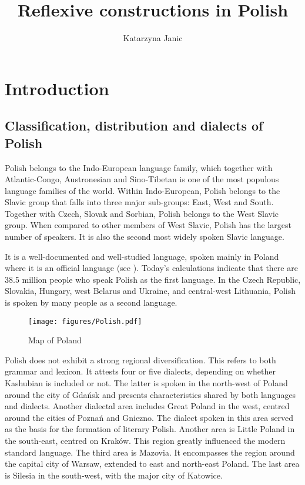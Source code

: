 \documentclass[output=paper]{langscibook}
\author{Katarzyna Janic\affiliation{Leipzig University}}
\title{Reflexive constructions in Polish}
\begin{document}
\maketitle

\section{Introduction} \label{sec:Janic:1}

\subsection{Classification, distribution and dialects of Polish} \label{sec:Janic:1.1}

Polish belongs to the Indo-European language family, which together with Atlantic-Congo, Austronesian and Sino-Tibetan is one of the most populous language families of the world. Within Indo-European, Polish belongs to the Slavic group that falls into three major sub-groups: East, West and South. Together with Czech, Slovak and Sorbian, Polish belongs to the West Slavic group. When compared to other members of West Slavic, Polish has the largest number of speakers. It is also the second most widely spoken Slavic language.

It is a well-documented and well-studied language, spoken mainly in Poland where it is an official language (see ). Today’s calculations indicate that there are 38.5 million people who speak Polish as the first language. In the Czech Republic, Slovakia, Hungary, west Belarus and Ukraine, and central-west Lithuania, Polish is spoken by many people as a second language. 

\begin{figure}
\texttt{[image: figures/Polish.pdf]}
  \caption{\label{fig:Janic:1}Map of Poland}
\end{figure}


Polish does not exhibit a strong regional diversification. This refers to both grammar and lexicon. It attests four or five dialects, depending on whether Kashubian is included or not. The latter is spoken in the north-west of Poland around the city of Gdańsk and presents characteristics shared by both languages and dialects. Another dialectal area includes Great Poland in the west, centred around the cities of Poznań and Gniezno. The dialect spoken in this area served as the basis for the formation of literary Polish. Another area is Little Poland in the south-east, centred on Kraków. This region greatly influenced the modern standard language. The third area is Mazovia. It encompasses the region around the capital city of Warsaw, extended to east and north-east Poland. The last area is Silesia in the south-west, with the major city of Katowice.
\end{document}
